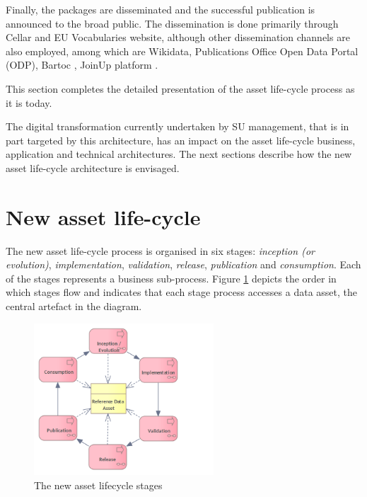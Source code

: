 	Finally, the packages are disseminated and the successful publication is announced to the broad public. The dissemination is done primarily through Cellar\citep{cdm-francesconi2015ontology} and EU Vocabularies website, although other dissemination channels are also employed, among which are Wikidata\citep{vrandevcic2014wikidata}, Publications Office Open Data Portal (ODP), Bartoc \citep{ledl2016describing}, JoinUp platform \citep{hillenius2013free}.
	
	This section completes the detailed presentation of the asset life-cycle process as it is today. 
	
	The digital transformation currently undertaken by SU management, that is in part targeted by this architecture, has an impact on the asset life-cycle business, application and technical architectures. The next sections describe how the new asset life-cycle architecture is envisaged. 
		
	\section{New asset life-cycle}
	\label{sec:lifecycle-new}	
	
    The new asset life-cycle process is organised in six stages: \textit{inception (or evolution)}, \textit{implementation}, \textit{validation}, \textit{release}, \textit{publication} and \textit{consumption}. Each of the stages represents a business sub-process. Figure \ref{fig:lifecycle-new-stages} depicts the order in which stages flow and indicates that each stage process accesses a data asset, the central artefact in the diagram.
	
	\begin{figure}[h]
		\centering
		\includegraphics[width=0.6\textwidth]{docs/architecture/images/business/Lifecycle process only (new).png}
		\caption{The new asset lifecycle stages}
		\label{fig:lifecycle-new-stages}
	\end{figure}
	
